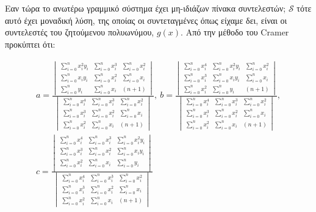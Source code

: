 \documentclass[12pt]{article}
\begin{document}
Εαν τώρα το ανωτέρω γραμμικό σύστημα έχει μη-ιδιάζων πίνακα συντελεστών;
\(\mathcal{S}\) τότε αυτό έχει μοναδική λύση, της οποίας οι
συντεταγμένες όπως είχαμε δει, είναι οι συντελεστές του ζητούμενου
πολυωνύμου, \(g(x)\). Aπό την μέθοδο του Cramer προκύπτει ότι:

\begin{gather*}
a=\frac{\begin{vmatrix}
\sum_{i=0}^n x_i^2y_i & \sum_{i=0}^n x_i^3 & \sum_{i=0}^n x_i^2 \\
\sum_{i=0}^n x_iy_i & \sum_{i=0}^n x_i^2 & \sum_{i=0}^n x_i \\
\sum_{i=0}^n y_i & \sum_{i=0}^n x_i & (n+1)
\end{vmatrix}}{\begin{vmatrix}
\sum_{i=0}^n x_i^4 & \sum_{i=0}^n x_i^3 & \sum_{i=0}^n x_i^2 \\
\sum_{i=0}^n x_i^3 & \sum_{i=0}^n x_i^2 & \sum_{i=0}^n x_i \\
\sum_{i=0}^n x_i^2 & \sum_{i=0}^n x_i & (n+1)
\end{vmatrix}}, \ 
b=\frac{\begin{vmatrix}
\sum_{i=0}^n x_i^4 & \sum_{i=0}^n x_i^2y_i & \sum_{i=0}^n x_i^2 \\
\sum_{i=0}^n x_i^3 & \sum_{i=0}^n x_iy_i & \sum_{i=0}^n x_i \\
\sum_{i=0}^n x_i^2 & \sum_{i=0}^n y_i & (n+1)
\end{vmatrix}}{\begin{vmatrix}
\sum_{i=0}^n x_i^4 & \sum_{i=0}^n x_i^3 & \sum_{i=0}^n x_i^2 \\
\sum_{i=0}^n x_i^3 & \sum_{i=0}^n x_i^2 & \sum_{i=0}^n x_i \\
\sum_{i=0}^n x_i^2 & \sum_{i=0}^n x_i & (n+1)
\end{vmatrix}}, \\
c=\frac{\begin{vmatrix}
\sum_{i=0}^n x_i^4 & \sum_{i=0}^n x_i^3 & \sum_{i=0}^n x_i^2y_i \\
\sum_{i=0}^n x_i^3 & \sum_{i=0}^n x_i^2 & \sum_{i=0}^n x_iy_i \\
\sum_{i=0}^n x_i^2 & \sum_{i=0}^n x_i & \sum_{i=0}^n y_i \\
\end{vmatrix}}{\begin{vmatrix}
\sum_{i=0}^n x_i^4 & \sum_{i=0}^n x_i^3 & \sum_{i=0}^n x_i^2 \\
\sum_{i=0}^n x_i^3 & \sum_{i=0}^n x_i^2 & \sum_{i=0}^n x_i \\
\sum_{i=0}^n x_i^2 & \sum_{i=0}^n x_i & (n+1)
\end{vmatrix}}
\end{gather*}
\end{document}
